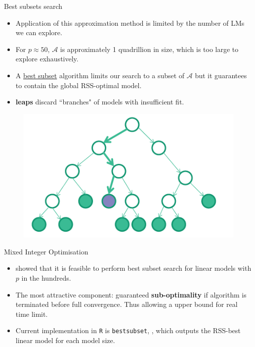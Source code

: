 \documentclass[12pt,aspectratio=169]{beamer}
\begin{document}
\begin{frame}{Best subsets search}
	\begin{itemize}
		
		\item Application of this approximation method is limited by the number of LMs we can explore.
		
		\item For $ p \approx 50 $, $ \mathcal{A}$ is approximately 1 quadrillion in size, which is too large to explore exhaustively. 
		
		\item A \underline{best subset} algorithm limits our search to a subset of $ \mathcal{A} $ but it guarantees to contain the global RSS-optimal model.
		
		\item \textbf{leaps} \citep{Furnival1974, Lumley2017} discard ``branches" of models with insufficient fit. 
	\end{itemize}

\begin{figure}
	\centering
	\includegraphics[width=0.35\linewidth]{branch_and_bound}
	\label{fig:branchandbound}
\end{figure}
\end{frame}



\begin{frame}{Mixed Integer Optimisation}
\begin{itemize}
	\item \cite{Bertsimas2016} showed that it is feasible to perform best subset search for linear models with $ p $ in the hundreds.
	\item The most attractive component: guaranteed \textbf{sub-optimality} if algorithm is terminated before full convergence. Thus allowing a upper bound for real time limit.
	\item Current implementation in \texttt{R} is \texttt{bestsubset}, \citep{Hastie2017}, which outputs the RSS-best linear model for each model size. 
\end{itemize}
\end{frame}
\end{document}
